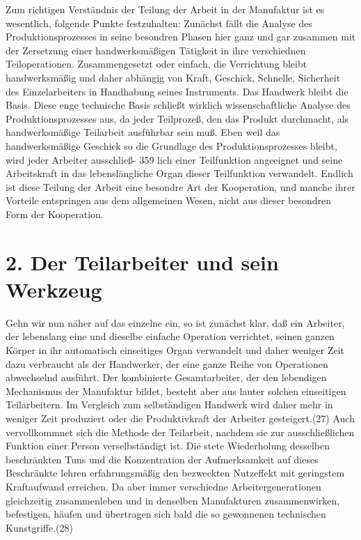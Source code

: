 {Zum richtigen Verständnis der Teilung der Arbeit in der Manufaktur ist
es wesentlich, folgende Punkte festzuhalten: Zunächst fällt die Analyse
des Produktionsprozesses in seine besondren Phasen hier ganz und gar
zusammen mit der Zersetzung einer handwerksmäßigen Tätigkeit in ihre
verschiednen Teiloperationen. Zusammengesetzt oder einfach, die
Verrichtung bleibt handwerksmäßig und daher abhängig von Kraft,
Geschick, Schnelle, Sicherheit des Einzelarbeiters in Handhabung seines
Instruments. Das Handwerk bleibt die Basis. Diese enge technische Basis
schließt wirklich wissenschaftliche Analyse des Produktionsprozesses
aus, da jeder Teilprozeß, den das Produkt durchmacht, als
handwerksmäßige Teilarbeit ausführbar sein muß. Eben weil das
handwerksmäßige Geschick so die Grundlage des Produktionsprozesses
bleibt, wird jeder Arbeiter ausschließ- \num{359}
lich einer Teilfunktion angeeignet und seine Arbeitskraft in das
lebenslängliche Organ dieser Teilfunktion verwandelt. Endlich ist diese
Teilung der Arbeit eine besondre Art der Kooperation, und manche ihrer
Vorteile entspringen aus dem allgemeinen Wesen, nicht aus dieser
besondren Form der Kooperation.

{%
\section{2. Der Teilarbeiter und sein
Werkzeug}\label{der-teilarbeiter-und-sein-werkzeug}}

Gehn wir nun näher auf das einzelne ein, so ist zunächst klar, daß ein
Arbeiter, der lebenslang eine und dieselbe einfache Operation
verrichtet, seinen ganzen Körper in ihr automatisch einseitiges Organ
verwandelt und daher weniger Zeit dazu verbraucht als der Handwerker,
der eine ganze Reihe von Operationen abwechselnd ausführt. Der
kombinierte Gesamtarbeiter, der den lebendigen Mechanismus der
Manufaktur bildet, besteht aber aus lauter solchen einseitigen
Teilarbeitern. Im Vergleich zum selbständigen Handwerk wird daher mehr
in weniger Zeit produziert oder die Produktivkraft der Arbeiter
gesteigert.(27) Auch vervollkommnet sich die Methode der Teilarbeit,
nachdem sie zur ausschließlichen Funktion einer Person verselbständigt
ist. Die stete Wiederholung desselben beschränkten Tuns und die
Konzentration der Aufmerksamkeit auf dieses Beschränkte lehren
erfahrungsmäßig den bezweckten Nutzeffekt mit geringstem Kraftaufwand
erreichen. Da aber immer verschiedne Arbeitergenerationen gleichzeitig
zusammenleben und in denselben Manufakturen zusammenwirken, befestigen,
häufen und übertragen sich bald die so gewonnenen technischen
Kunstgriffe.(28)

}
